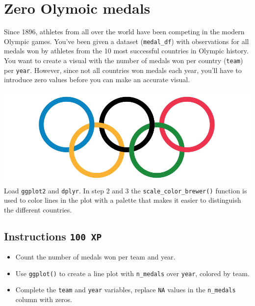 \documentclass[
  letterpaper,
  DIV=11,
  numbers=noendperiod]{scrreprt}
\providecommand{\tightlist}{%
  \setlength{\itemsep}{0pt}\setlength{\parskip}{0pt}}\usepackage{longtable,booktabs,array}
\begin{document}
\hypertarget{zero-olymoic-medals}{%
\section{Zero Olymoic medals}\label{zero-olymoic-medals}}

Since 1896, athletes from all over the world have been competing in the
modern Olympic games. You've been given a dataset (\texttt{medal\_df})
with observations for all medals won by athletes from the 10 most
successful countries in Olympic history. You want to create a visual
with the number of medals won per country (\texttt{team}) per
\texttt{year}. However, since not all countries won medals each year,
you'll have to introduce zero values before you can make an accurate
visual.

\includegraphics{./olympic_flag_large.png} Load \texttt{ggplot2} and
\texttt{dplyr}. In step 2 and 3 the \texttt{scale\_color\_brewer()}
function is used to color lines in the plot with a palette that makes it
easier to distinguish the different countries.

\hypertarget{instructions-100-xp-20}{%
\subsection*{\texorpdfstring{Instructions
\texttt{100\ XP}}{Instructions 100 XP}}\label{instructions-100-xp-20}}

\begin{itemize}
\tightlist
\item
  Count the number of medals won per team and year.
\item
  Use \texttt{ggplot()} to create a line plot with \texttt{n\_medals}
  over \texttt{year}, colored by team.
\item
  Complete the \texttt{team} and \texttt{year} variables, replace
  \texttt{NA} values in the \texttt{n\_medals} column with zeros.
\end{itemize}
\end{document}
